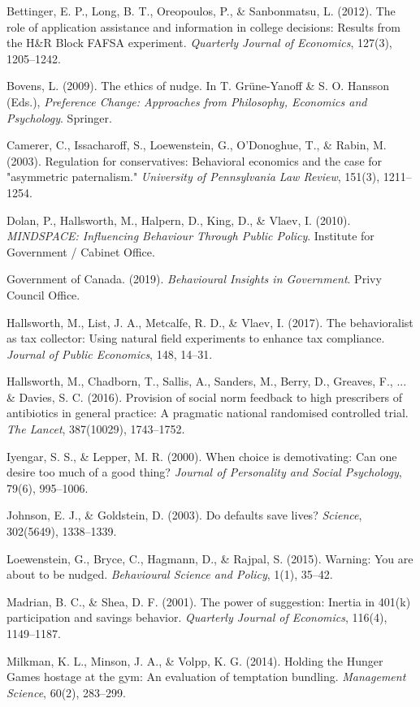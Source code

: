 \documentclass[12pt, letterpaper]{article}
\begin{document}
Bettinger, E. P., Long, B. T., Oreopoulos, P., \& Sanbonmatsu, L. (2012). The role of application assistance and information in college decisions: Results from the H\&R Block FAFSA experiment. \textit{Quarterly Journal of Economics}, 127(3), 1205--1242.

Bovens, L. (2009). The ethics of nudge. In T. Grüne-Yanoff \& S. O. Hansson (Eds.), \textit{Preference Change: Approaches from Philosophy, Economics and Psychology}. Springer.

Camerer, C., Issacharoff, S., Loewenstein, G., O'Donoghue, T., \& Rabin, M. (2003). Regulation for conservatives: Behavioral economics and the case for "asymmetric paternalism." \textit{University of Pennsylvania Law Review}, 151(3), 1211--1254.

Dolan, P., Hallsworth, M., Halpern, D., King, D., \& Vlaev, I. (2010). \textit{MINDSPACE: Influencing Behaviour Through Public Policy}. Institute for Government / Cabinet Office.

Government of Canada. (2019). \textit{Behavioural Insights in Government}. Privy Council Office.

Hallsworth, M., List, J. A., Metcalfe, R. D., \& Vlaev, I. (2017). The behavioralist as tax collector: Using natural field experiments to enhance tax compliance. \textit{Journal of Public Economics}, 148, 14--31.

Hallsworth, M., Chadborn, T., Sallis, A., Sanders, M., Berry, D., Greaves, F., ... \& Davies, S. C. (2016). Provision of social norm feedback to high prescribers of antibiotics in general practice: A pragmatic national randomised controlled trial. \textit{The Lancet}, 387(10029), 1743--1752.

Iyengar, S. S., \& Lepper, M. R. (2000). When choice is demotivating: Can one desire too much of a good thing? \textit{Journal of Personality and Social Psychology}, 79(6), 995--1006.

Johnson, E. J., \& Goldstein, D. (2003). Do defaults save lives? \textit{Science}, 302(5649), 1338--1339.

Loewenstein, G., Bryce, C., Hagmann, D., \& Rajpal, S. (2015). Warning: You are about to be nudged. \textit{Behavioural Science and Policy}, 1(1), 35--42.

Madrian, B. C., \& Shea, D. F. (2001). The power of suggestion: Inertia in 401(k) participation and savings behavior. \textit{Quarterly Journal of Economics}, 116(4), 1149--1187.

Milkman, K. L., Minson, J. A., \& Volpp, K. G. (2014). Holding the Hunger Games hostage at the gym: An evaluation of temptation bundling. \textit{Management Science}, 60(2), 283--299.
\end{document}
